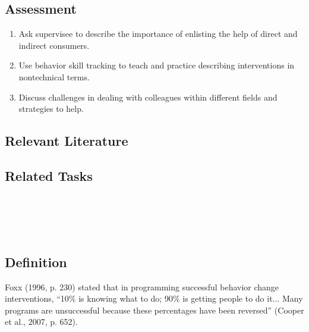 \subsection{Assessment}
\begin{enumerate}
\item Ask supervisee to describe the importance of enlisting the help of direct and indirect consumers.
\item Use behavior skill tracking to teach and practice describing interventions in nontechnical terms.
\item Discuss challenges in dealing with colleagues within different fields and strategies to help.
\end{enumerate}
%
\subsection{Relevant Literature}
\begin{refsection}
\nocite{test,alang2017police,clayton2018black}
\printbibliography[heading=none]
\end{refsection} 
%                         
\subsection{Related Tasks}
\fourgSeven{}\\
\fourkNine{}\\
\fourkTen{}\\
%
%
%
%
%
%
%
\section[\fourkNine{}]{\fourkNine{}%
              }
\subsection{Definition}
Foxx (1996, p. 230) stated that in programming successful behavior change interventions, ``10\% is knowing what to do; 90\% is getting people to do it... Many programs are unsuccessful because these percentages have been reversed'' (Cooper et al., 2007, p. 652). 


